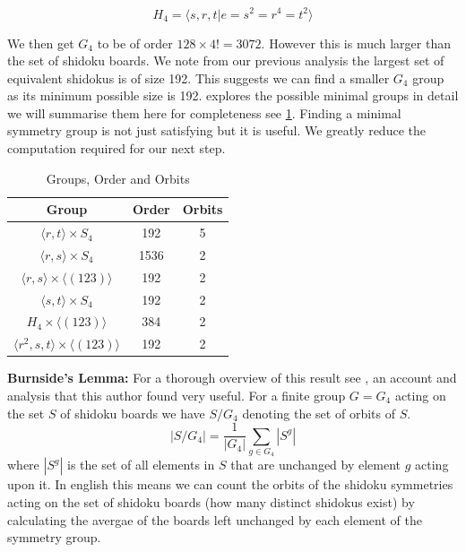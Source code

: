 \documentclass[a4paper,11pt]{report}
\begin{document}
\begin{equation}H_4 = \langle s,r,t | e=s^2=r^4=t^2\rangle\end{equation}

We then get $G_4$ to be of order $128\times 4!=3072$. However this is much larger than the set of shidoku boards. We note from our previous analysis the largest set of equivalent shidokus is of size 192. This suggests we can find a smaller $G_4$ group as its minimum possible size is 192. \cite{} explores the possible minimal groups in detail we will summarise them here for completeness see \ref{table:group}. Finding a minimal symmetry group is not just satisfying but it is useful. We greatly reduce the computation required for our next step.

\begin{table}[!h]
\begin{center}
\begin{tabular}{ |c|c|c| }
 \hline
Group & Order & Orbits\\
 \hline
 $\langle r,t \rangle \times S_4$ & 192 & 5\\
 $\langle r,s \rangle \times S_4$ & 1536 & 2\\
 $\langle r,s \rangle \times \langle (123)\rangle$ & 192 & 2\\
 $\langle s,t \rangle \times S_4$ & 192 & 2\\
 $H_4 \times\langle (123) \rangle $ & 384 & 2\\
 $\langle r^2,s,t \rangle \times \langle (123) \rangle$ & 192 & 2\\
 \hline
\end{tabular}
\end{center}
\caption{\label{table:group}Groups, Order and Orbits}
\end{table}

\textbf{Burnside's Lemma:} For a thorough overview of this result see \cite{analysis and applications of burnsides lemma jenny jin}, an account and analysis that this author found very useful. For a finite group $G=G_4$ acting on the set $S$ of shidoku boards we have $S/G_4$ denoting the set of orbits of $S$. 
\begin{equation} |S/G_4|=\frac{1}{|G_4|}\sum_{g\in G_4}|S^g|\end{equation}
where $|S^g|$ is the set of all elements in $S$ that are unchanged by element $g$ acting upon it. In english this means we can count the orbits of the shidoku symmetries acting on the set of shidoku boards (how many distinct shidokus exist) by calculating the avergae of the boards left unchanged by each element of the symmetry group. 
\end{document}
